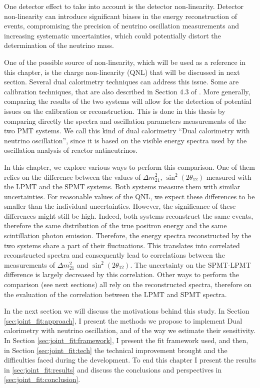 \documentclass[../main.tex]{subfiles}
\begin{document}
One detector effect to take into account is the detector  non-linearity. Detector non-linearity can introduce significant biases in the energy reconstruction of events, compromising the precision of neutrino oscillation measurements and increasing systematic uncertainties, which could potentially distort the determination of the neutrino mass.

One of the possible source of non-linearity, which will be used as a reference in this chapter, is the charge non-linearity (QNL) that will be discussed in next section.
Several dual calorimetry techniques can address this issue. Some are calibration techniques, that are also described in Section 4.3 of \cite{han_dual_2021}.
More generally, comparing the results of the two systems will allow for the detection of potential issues on the calibration or reconstruction. This is done in this thesis by comparing directly the spectra and oscillation parameters measurements of the two PMT systems. We call this kind of dual calorimetry ``Dual calorimetry with neutrino oscillation'', since it is based on the visible energy spectra used by the oscillation analysis of reactor antineutrinos.

In this chapter, we explore various ways to perform this comparison. One of them relies on the difference between the values of $\Delta m^2_{21}$, $\sin^2(2\theta_{12})$ measured with the LPMT and the SPMT systems.
Both systems measure them with similar uncertainties. For reasonable values of the QNL, we expect these differences to be smaller than the individual uncertainties. However, the significance of these differences might still be high. Indeed, both systems reconstruct the same events, therefore the same distribution of the true positron energy and the same scintillation photon emission. Therefore, the energy spectra reconstructed by the two systems share a part of their fluctuations. This translates into correlated reconstructed spectra and consequently lead to correlations between the measurements of $\Delta m^2_{21}$ and $\sin^2(2\theta_{12})$. The uncertainty on the SPMT-LPMT difference is largely decreased by this correlation.  Other ways to perform the comparison
(see next sections) all rely on the reconstructed spectra, therefore on the evaluation of the correlation between the LPMT and SPMT spectra.

In the next section we will discuss the motivations behind this study. In Section \ref{sec:joint_fit:approach}, I present the methods we propose to implement Dual calorimetry with neutrino oscillation, and of the way we estimate their sensitivity. In Section \ref{sec:joint_fit:framework}, I present the fit framework used, and then, in Section \ref{sec:joint_fit:tech} the technical improvement brought and the difficulties faced during the development. To end this chapter I present the results in \ref{sec:joint_fit:results} and discuss the conclusions and perspectives in \ref{sec:joint_fit:conclusion}.
\end{document}
